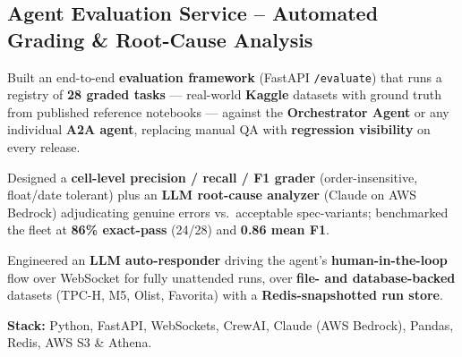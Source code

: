 \documentclass[letter,10pt]{article}
\begin{document}
\subsection{Agent Evaluation Service -- Automated Grading \& Root-Cause Analysis}
\begin{zitemize}
\item Built an end-to-end \textbf{evaluation framework} (FastAPI \texttt{/evaluate}) that runs a registry of \textbf{28 graded tasks} --- real-world \textbf{Kaggle} datasets with ground truth from published reference notebooks --- against the \textbf{Orchestrator Agent} or any individual \textbf{A2A agent}, replacing manual QA with \textbf{regression visibility} on every release.
\item Designed a \textbf{cell-level precision / recall / F1 grader} (order-insensitive, float/date tolerant) plus an \textbf{LLM root-cause analyzer} (Claude on AWS Bedrock) adjudicating genuine errors vs.\ acceptable spec-variants; benchmarked the fleet at \textbf{86\% exact-pass} (24/28) and \textbf{0.86 mean F1}.
\item Engineered an \textbf{LLM auto-responder} driving the agent's \textbf{human-in-the-loop} flow over WebSocket for fully unattended runs, over \textbf{file- and database-backed} datasets (TPC-H, M5, Olist, Favorita) with a \textbf{Redis-snapshotted run store}.
\item \textbf{Stack:} Python, FastAPI, WebSockets, CrewAI, Claude (AWS Bedrock), Pandas, Redis, AWS S3 \& Athena.
\end{zitemize}

\end{document}
